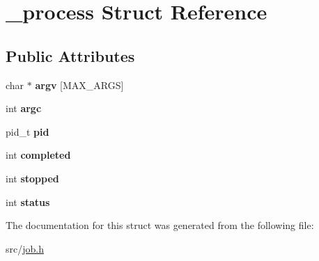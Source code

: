 \hypertarget{struct__process}{\section{\-\_\-process Struct Reference}
\label{struct__process}
}
\subsection*{Public Attributes}
\begin{DoxyCompactItemize}
\item 
\hypertarget{struct__process_a9bedf3d000c74461921ad68651a3752c}{char $\ast$ {\bfseries argv} \mbox{[}M\-A\-X\-\_\-\-A\-R\-G\-S\mbox{]}}\label{struct__process_a9bedf3d000c74461921ad68651a3752c}

\item 
\hypertarget{struct__process_a101ac531e210400c832cfe4cb05b022f}{int {\bfseries argc}}\label{struct__process_a101ac531e210400c832cfe4cb05b022f}

\item 
\hypertarget{struct__process_aebc44dfe93838e677e88b732390b3721}{pid\-\_\-t {\bfseries pid}}\label{struct__process_aebc44dfe93838e677e88b732390b3721}

\item 
\hypertarget{struct__process_a5b05357cc7128de7d6b6089d6cc4b6b6}{int {\bfseries completed}}\label{struct__process_a5b05357cc7128de7d6b6089d6cc4b6b6}

\item 
\hypertarget{struct__process_a28951ef8d0bf29360fad667dbb12ae77}{int {\bfseries stopped}}\label{struct__process_a28951ef8d0bf29360fad667dbb12ae77}

\item 
\hypertarget{struct__process_a92536d9b184e75911510a19a67049038}{int {\bfseries status}}\label{struct__process_a92536d9b184e75911510a19a67049038}

\end{DoxyCompactItemize}


The documentation for this struct was generated from the following file\-:\begin{DoxyCompactItemize}
\item 
src/\hyperlink{job_8h}{job.\-h}\end{DoxyCompactItemize}
